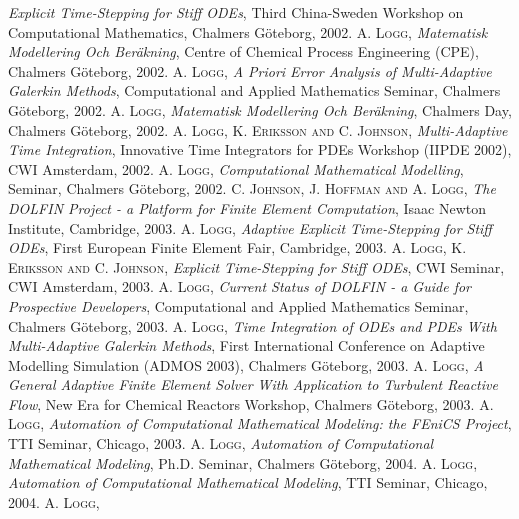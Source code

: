\begin{thebibliography}{99}
{\textit{Explicit Time-Stepping for Stiff {ODE}s},
Third China-Sweden Workshop on Computational Mathematics, Chalmers G{\"o}teborg,
2002.
}
 {\textsc{A. Logg},
\textit{Matematisk Modellering Och Ber\"akning},
Centre of Chemical Process Engineering (CPE), Chalmers G{\"o}teborg,
2002.
}
 {\textsc{A. Logg},
\textit{A Priori Error Analysis of Multi-Adaptive {G}alerkin Methods},
Computational and Applied Mathematics Seminar, Chalmers G{\"o}teborg,
2002.
}
 {\textsc{A. Logg},
\textit{Matematisk Modellering Och Ber\"akning},
Chalmers Day, Chalmers G{\"o}teborg,
2002.
}
 {\textsc{A. Logg, K. Eriksson and C. Johnson},
\textit{Multi-Adaptive Time Integration},
Innovative Time Integrators for PDEs Workshop (IIPDE 2002), CWI Amsterdam,
2002.
}
 {\textsc{A. Logg},
\textit{Computational Mathematical Modelling},
Seminar, Chalmers G{\"o}teborg,
2002.
}
 {\textsc{C. Johnson, J. Hoffman and A. Logg},
\textit{The {DOLFIN} Project - a Platform for Finite Element Computation},
Isaac Newton Institute, Cambridge,
2003.
}
 {\textsc{A. Logg},
\textit{Adaptive Explicit Time-Stepping for Stiff {ODE}s},
First European Finite Element Fair, Cambridge,
2003.
}
 {\textsc{A. Logg, K. Eriksson and C. Johnson},
\textit{Explicit Time-Stepping for Stiff {ODE}s},
CWI Seminar, CWI Amsterdam,
2003.
}
 {\textsc{A. Logg},
\textit{Current Status of {DOLFIN} - a Guide for Prospective Developers},
Computational and Applied Mathematics Seminar, Chalmers G{\"o}teborg,
2003.
}
 {\textsc{A. Logg},
\textit{Time Integration of {ODE}s and {PDE}s With Multi-Adaptive {G}alerkin Methods},
First International Conference on Adaptive Modelling Simulation (ADMOS 2003), Chalmers G{\"o}teborg,
2003.
}
 {\textsc{A. Logg},
\textit{A General Adaptive Finite Element Solver With Application to Turbulent Reactive Flow},
New Era for Chemical Reactors Workshop, Chalmers G{\"o}teborg,
2003.
}
 {\textsc{A. Logg},
\textit{Automation of Computational Mathematical Modeling: the {FE}ni{CS} Project},
TTI Seminar, Chicago,
2003.
}
 {\textsc{A. Logg},
\textit{Automation of Computational Mathematical Modeling},
Ph.D. Seminar, Chalmers G{\"o}teborg,
2004.
}
 {\textsc{A. Logg},
\textit{Automation of Computational Mathematical Modeling},
TTI Seminar, Chicago,
2004.
}
 {\textsc{A. Logg},
}
\end{thebibliography}
